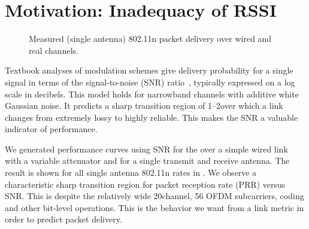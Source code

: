 \section{Motivation: Inadequacy of RSSI}
\begin{figure}[t!]
	\centering
\hfill%
\hfill%
\hfill%
	\caption[Packet delivery over wired and real 802.11 channels.]{\label{fig:rssi_predictions}Measured (single antenna) 802.11n packet delivery over wired and real channels.}%
\end{figure}
Textbook analyses of modulation schemes give delivery probability for a single signal in terms of the signal-to-noise (SNR) ratio~\cite{Goldsmith}, %
typically expressed on a log scale in decibels.
This model holds for narrowband channels with additive white Gaussian noise. It predicts a sharp transition region of 1--2\dB over which a link changes from extremely lossy to highly reliable. This makes the SNR a valuable indicator of performance.

We generated performance curves using SNR for the  over a simple wired link with a variable attenuator and for a single transmit and receive antenna. The result is shown for all single antenna 802.11n rates in . 
We observe a characteristic sharp transition region for packet reception rate (PRR) versus SNR\@. This is despite the relatively wide 20\MHz channel, 56 OFDM subcarriers, coding and other bit-level operations. This is the behavior we want from a link metric in order to predict packet delivery.

